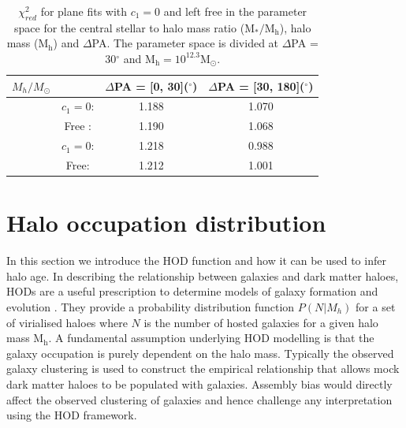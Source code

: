 \begin{table}
\centering
\begin{tabular}{|l|c|c|c|}
\hline
$M_{h}/M_{\odot}$& & $\Delta$PA = [0, 30]($^{\circ}$) & $\Delta$PA = [30, 180]($^{\circ}$) \\ \hline 
[$10^{11.7}, 10^{12.3}$] & $c_{1} = 0$: & 1.188 & 1.070 \\
					   & Free : & 1.190 & 1.068 \\ \hline
[$10^{12.3}, 10^{14}$]   & $c_{1} = 0$: & 1.218 & 0.988 \\ 
					   & Free: & 1.212 & 1.001 \\ \hline
\end{tabular}
\caption{$\chi_{red}^2$ for plane fits with $c_1 = 0$ and left free in the parameter space for the central stellar to halo mass ratio ($\mathrm{M_{\ast}/M_{h}}$), halo mass ($\mathrm{M_{h}}$) and $\Delta$PA. The parameter space is divided at $\Delta$PA = 30$^{\circ}$ and $\mathrm{M_{h} = 10^{12.3}M_{\odot}}$.}
\label{tab:chisq}
\end{table}

\section{Halo occupation distribution} \label{sec:HOD_hab}
In this section we introduce the HOD function and how it can be used to infer halo age. In describing the relationship between galaxies and dark matter haloes, HODs are a useful prescription to determine models of galaxy formation and evolution \citep[e.g.][]{berlind2003}. They provide a probability distribution function $P(N|M_h)$ for a set of virialised haloes where $N$ is the number of hosted galaxies for a given halo mass $\mathrm{M_h}$. A fundamental assumption underlying HOD modelling is that the galaxy occupation is purely dependent on the halo mass. Typically the observed galaxy clustering is used to construct the empirical relationship that allows mock dark matter haloes to be populated with galaxies. Assembly bias would directly affect the observed clustering of galaxies and hence challenge any interpretation using the HOD framework. 

